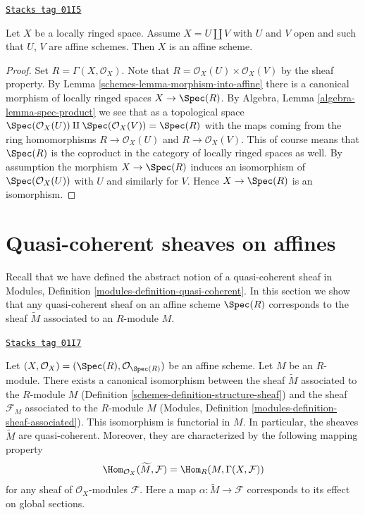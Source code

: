 \begin{lemma}
\label{schemes-lemma-disjoint-union-affines}
\href{https://stacks.math.columbia.edu/tag/01I5}{\texttt{Stacks tag 01I5}}

Let $X$ be a locally ringed space.
Assume $X = U \amalg V$ with $U$ and $V$ open and
such that $U$, $V$ are affine schemes. Then $X$ is an affine scheme.
\end{lemma}

\begin{proof}

Set $R = \Gamma(X, \mathcal{O}_X)$.
Note that $R = \mathcal{O}_X(U) \times \mathcal{O}_X(V)$
by the sheaf property. By Lemma \ref{schemes-lemma-morphism-into-affine}
there is a canonical morphism of locally ringed spaces
$X \to \Spec(R)$. By Algebra, Lemma \ref{algebra-lemma-spec-product}
we see that as a topological space
$\Spec(\mathcal{O}_X(U)) \amalg \Spec(\mathcal{O}_X(V)) =
\Spec(R)$
with the maps coming from the ring homomorphisms
$R \to \mathcal{O}_X(U)$ and $R \to \mathcal{O}_X(V)$.
This of course means that $\Spec(R)$ is the coproduct
in the category of locally ringed spaces as well.
By assumption the morphism $X \to \Spec(R)$ induces an isomorphism
of $\Spec(\mathcal{O}_X(U))$ with $U$ and similarly
for $V$. Hence $X \to \Spec(R)$ is an isomorphism.
\end{proof}

\section{Quasi-coherent sheaves on affines}
\label{schemes-section-quasi-coherent-affine}
Recall that we have defined the abstract notion of a quasi-coherent
sheaf in Modules, Definition \ref{modules-definition-quasi-coherent}.
In this section we show that any quasi-coherent sheaf on an affine
scheme $\Spec(R)$ corresponds to the sheaf $\widetilde M$ associated to
an $R$-module $M$.

\begin{lemma}
\label{schemes-lemma-compare-constructions}
\href{https://stacks.math.columbia.edu/tag/01I7}{\texttt{Stacks tag 01I7}}

Let $(X, \mathcal{O}_X) = (\Spec(R), \mathcal{O}_{\Spec(R)})$
be an affine scheme. Let $M$ be an $R$-module. There exists a canonical
isomorphism between the sheaf $\widetilde M$ associated to the $R$-module
$M$ (Definition \ref{schemes-definition-structure-sheaf}) and the sheaf
$\mathcal{F}_M$ associated to the $R$-module $M$
(Modules, Definition \ref{modules-definition-sheaf-associated}).
This isomorphism is functorial in $M$. In particular,
the sheaves $\widetilde M$ are quasi-coherent. Moreover, they
are characterized by the following mapping property
$$
\Hom_{\mathcal{O}_X}(\widetilde M, \mathcal{F})
=
\Hom_R(M, \Gamma(X, \mathcal{F}))
$$
for any sheaf of $\mathcal{O}_X$-modules $\mathcal{F}$.
Here a map $\alpha : \widetilde M \to \mathcal{F}$ corresponds
to its effect on global sections.
\end{lemma}

